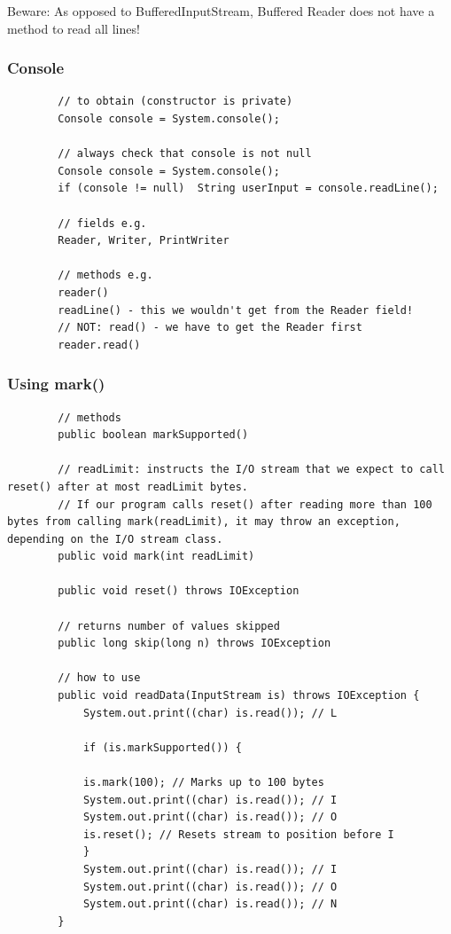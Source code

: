 \documentclass{scrartcl}
\begin{document}
    Beware: As opposed to BufferedInputStream, Buffered Reader does not have a method to read all lines!

\subsubsection{Console}

    \begin{lstlisting}
        // to obtain (constructor is private)
        Console console = System.console();

        // always check that console is not null
        Console console = System.console();
        if (console != null)  String userInput = console.readLine();

        // fields e.g.
        Reader, Writer, PrintWriter

        // methods e.g.
        reader()
        readLine() - this we wouldn't get from the Reader field!
        // NOT: read() - we have to get the Reader first
        reader.read()
    \end{lstlisting}

\subsubsection{Using mark()}

    \begin{lstlisting}
        // methods
        public boolean markSupported()

        // readLimit: instructs the I/O stream that we expect to call reset() after at most readLimit bytes.
        // If our program calls reset() after reading more than 100 bytes from calling mark(readLimit), it may throw an exception, depending on the I/O stream class.
        public void mark(int readLimit)

        public void reset() throws IOException

        // returns number of values skipped
        public long skip(long n) throws IOException

        // how to use
        public void readData(InputStream is) throws IOException {
            System.out.print((char) is.read()); // L

            if (is.markSupported()) {

            is.mark(100); // Marks up to 100 bytes
            System.out.print((char) is.read()); // I
            System.out.print((char) is.read()); // O
            is.reset(); // Resets stream to position before I
            }
            System.out.print((char) is.read()); // I
            System.out.print((char) is.read()); // O
            System.out.print((char) is.read()); // N
        }
    \end{lstlisting}
\end{document}
